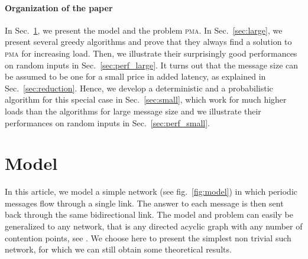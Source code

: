 \documentclass[a4paper,UKenglish,cleveref, autoref, thm-restate]{lipics-v2019}
\newcommand\pma{\textsc{pma}\xspace}
\begin{document}
\paragraph{Organization of the paper}

In Sec.~\ref{sec:model}, we present the model and the problem \pma. In Sec.~\ref{sec:large},
we present several greedy algorithms and prove that they always find a solution to \pma for increasing load. Then, we illustrate their surprisingly good performances on random inputs in Sec.~\ref{sec:perf_large}. It turns out that the message size can be assumed to be one for a small price in added latency, as explained in Sec.~\ref{sec:reduction}. Hence, we develop a deterministic and a probabilistic algorithm for this special case in Sec.~\ref{sec:small}, which work for much higher loads than the algorithms for large message size and we illustrate their performances on random inputs in Sec.~\ref{sec:perf_small}.


\section{Model}\label{sec:model}


In this article, we model a simple network (see fig.~\ref{fig:model}) in which periodic messages flow through a single link. The answer to each message is then sent back through the same bidirectional link. The model and problem can easily be generalized to any network, that is any directed acyclic graph with any number of contention points, see \cite{dominique2018deterministic}. We choose here to present the simplest non trivial such network, for which we can still obtain some theoretical results. 
\end{document}

